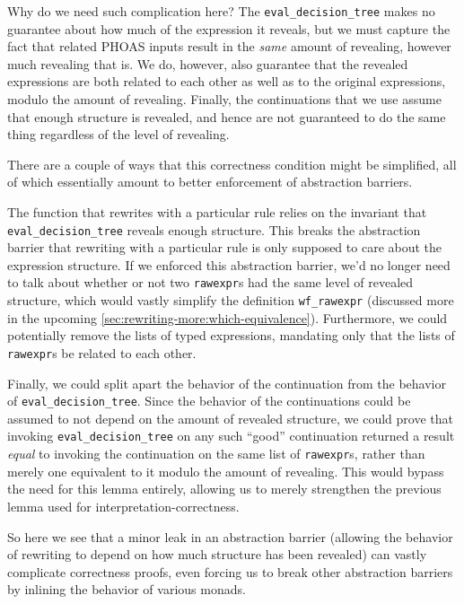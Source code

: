 Why do we need such complication here?
The \texttt{eval_decision_tree} makes no guarantee about how much of the expression it reveals, but we must capture the fact that related PHOAS inputs result in the \emph{same} amount of revealing, however much revealing that is.
We do, however, also guarantee that the revealed expressions are both related to each other as well as to the original expressions, modulo the amount of revealing.
Finally, the continuations that we use assume that enough structure is revealed, and hence are not guaranteed to do the same thing regardless of the level of revealing.

There are a couple of ways that this correctness condition might be simplified, all of which essentially amount to better enforcement of abstraction barriers.

The function that rewrites with a particular rule relies on the invariant that \texttt{eval_decision_tree} reveals enough structure.
This breaks the abstraction barrier that rewriting with a particular rule is only supposed to care about the expression structure.
If we enforced this abstraction barrier, we'd no longer need to talk about whether or not two \texttt{rawexpr}s had the same level of revealed structure, which would vastly simplify the definition \texttt{wf_rawexpr} (discussed more in the upcoming \autoref{sec:rewriting-more:which-equivalence}).
Furthermore, we could potentially remove the lists of typed expressions, mandating only that the lists of \texttt{rawexpr}s be related to each other.

Finally, we could split apart the behavior of the continuation from the behavior of \texttt{eval_decision_tree}.
Since the behavior of the continuations could be assumed to not depend on the amount of revealed structure, we could prove that invoking \texttt{eval_decision_tree} on any such ``good'' continuation returned a result \emph{equal} to invoking the continuation on the same list of \texttt{rawexpr}s, rather than merely one equivalent to it modulo the amount of revealing.
This would bypass the need for this lemma entirely, allowing us to merely strengthen the previous lemma used for interpretation-correctness.

So here we see that a minor leak in an abstraction barrier (allowing the behavior of rewriting to depend on how much structure has been revealed) can vastly complicate correctness proofs, even forcing us to break other abstraction barriers by inlining the behavior of various monads.

